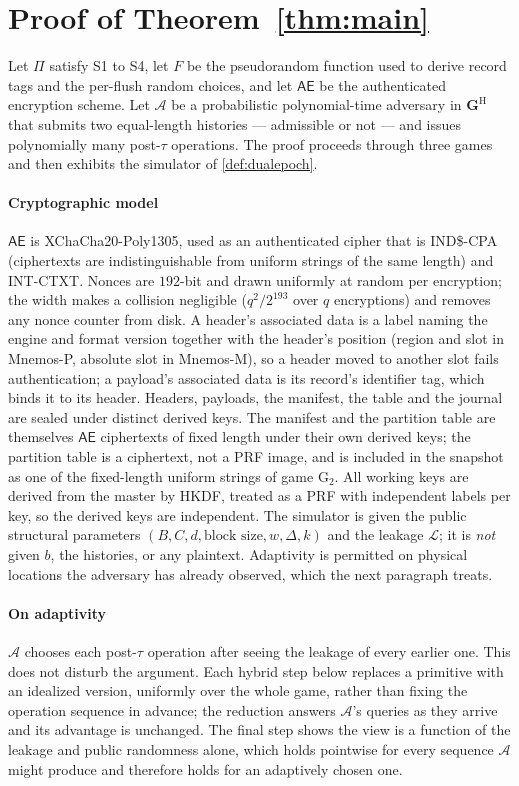 \section{Proof of Theorem~\ref{thm:main}}
\label{supp:proof}

Let $\Pi$ satisfy S1 to S4, let $F$ be the pseudorandom function used to derive record tags and
the per-flush random choices, and let $\mathsf{AE}$ be the authenticated encryption scheme. Let
$\mathcal{A}$ be a probabilistic polynomial-time adversary in $\mathbf{G}^{\mathrm{H}}$ that
submits two equal-length histories --- admissible or not --- and issues polynomially many post-$\tau$
operations. The proof proceeds through three games and then exhibits the simulator of
\cref{def:dualepoch}.

\paragraph{Cryptographic model} $\mathsf{AE}$ is
XChaCha20-Poly1305, used as an authenticated cipher that is IND\$-CPA (ciphertexts are
indistinguishable from uniform strings of the same length) and INT-CTXT. Nonces are $192$-bit and
drawn uniformly at random per encryption; the width makes a collision negligible ($q^2/2^{193}$ over
$q$ encryptions) and removes any nonce counter from disk. A header's associated data is a
label naming the engine and format version together with the header's position (region and slot in
Mnemos-P, absolute slot in Mnemos-M), so a header moved to another slot fails authentication; a
payload's associated data is its record's identifier tag, which binds it to its header. Headers,
payloads, the manifest, the table and the journal are sealed under distinct derived keys. The manifest and the partition
table are themselves $\mathsf{AE}$ ciphertexts of fixed length under their own derived keys; the
partition table is a ciphertext, not a PRF image, and is included in the snapshot as one of the
fixed-length uniform strings of game $\mathrm{G}_2$. All working keys are derived from the master by
HKDF, treated as a PRF with independent labels per key, so the derived keys are independent. The
simulator is given the public structural parameters $(B, C, d, \text{block size}, w, \Delta, k)$ and
the leakage $\mathcal{L}$; it is \emph{not} given $b$, the histories, or any plaintext. Adaptivity is
permitted on physical locations the adversary has already observed, which the next paragraph treats.

\paragraph{On adaptivity} $\mathcal{A}$ chooses each post-$\tau$ operation after seeing the leakage
of every earlier one. This does not disturb the argument. Each hybrid step below replaces a
primitive with an idealized version, uniformly over the whole game, rather than fixing the
operation sequence in advance; the reduction answers $\mathcal{A}$'s queries as they arrive and its
advantage is unchanged. The final step shows the view is a function of the leakage and public
randomness alone, which holds pointwise for every sequence $\mathcal{A}$ might produce and
therefore holds for an adaptively chosen one.

